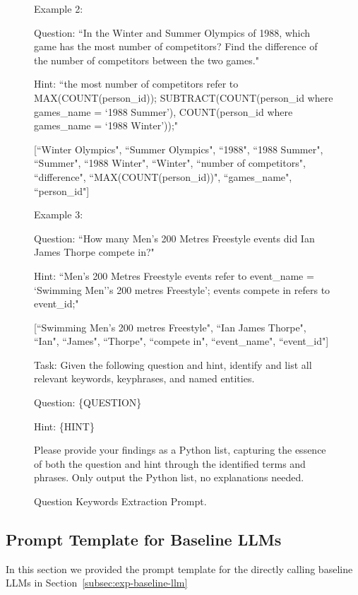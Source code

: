 \begin{figure}[h!]
\begin{tcolorbox}
\vspace{1em}
Example 2:

Question: ``In the Winter and Summer Olympics of 1988, which game has the most number of competitors? Find the difference of the number of competitors between the two games."

Hint: ``the most number of competitors refer to MAX(COUNT(person\_id)); SUBTRACT(COUNT(person\_id where games\_name = `1988 Summer'), COUNT(person\_id where games\_name = `1988 Winter'));"

[``Winter Olympics", ``Summer Olympics", ``1988", ``1988 Summer", ``Summer", ``1988 Winter", ``Winter", ``number of competitors", ``difference", ``MAX(COUNT(person\_id))", ``games\_name", ``person\_id"]

\vspace{1em}
Example 3:

Question: ``How many Men's 200 Metres Freestyle events did Ian James Thorpe compete in?"

Hint: ``Men's 200 Metres Freestyle events refer to event\_name = `Swimming Men''s 200 metres Freestyle'; events compete in refers to event\_id;"

[``Swimming Men's 200 metres Freestyle", ``Ian James Thorpe", ``Ian", ``James", ``Thorpe", ``compete in", ``event\_name", ``event\_id"]

\vspace{1em}
Task:
Given the following question and hint, identify and list all relevant keywords, keyphrases, and named entities.

Question: \{QUESTION\}

Hint: \{HINT\}

Please provide your findings as a Python list, capturing the essence of both the question and hint through the identified terms and phrases. 
Only output the Python list, no explanations needed. 

    \end{tcolorbox}
    \caption{Question Keywords Extraction Prompt.}
    \label{fig:prompt-keyword-extraction}
\end{figure}

\newpage
\clearpage

\subsection{Prompt Template for Baseline LLMs}
\label{sub:baseline-llm-prompt}
In this section we provided the prompt template for the directly calling baseline LLMs in Section~\ref{subsec:exp-baseline-llm}

